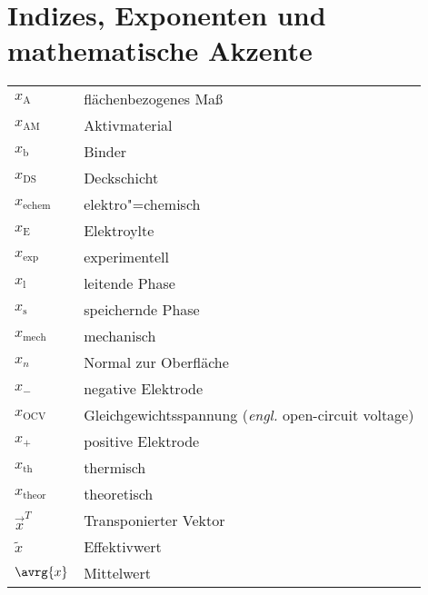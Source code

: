 {\section*{Indizes, Exponenten und mathematische Akzente}

\begin{longtable}{@{}p{\TabulatorVZ}@{}p{\TabulatorTX+\TabulatorEH+2\tabcolsep}@{}}
	$x_{\text{A}}$				& flächenbezogenes Maß\\
	$x_{\text{AM}}$				& Aktivmaterial\\
	$x_{\text{b}}$				& Binder\\
	$x_{\text{DS}}$				& Deckschicht\\
	$x_{\text{echem}}$			& elektro"=chemisch\\
	$x_{\text{E}}$				& Elektroylte\\
	$x_{\text{exp}}$			& experimentell\\
	$x_{\text{l}}$				& leitende Phase\\
	$x_{\text{s}}$				& speichernde Phase\\
	$x_{\text{mech}}$			& mechanisch\\
	$x_n$						& Normal zur Oberfläche	\\
	$x_{-}$						& negative Elektrode \\
	$x_{\text{OCV}}$			& Gleichgewichtsspannung (\textit{engl.} open-circuit voltage) \\
	$x_{+}$						& positive Elektrode \\
	$x_{\text{th}}$				& thermisch \\
	$x_{\text{theor}}$			& theoretisch \\
	$\vec{x}^T$					& Transponierter Vektor	\\
	$\tilde{x}$				    & Effektivwert 	\\
	$\avrg{x}$					& Mittelwert
\end{longtable}

} %


\clearpage